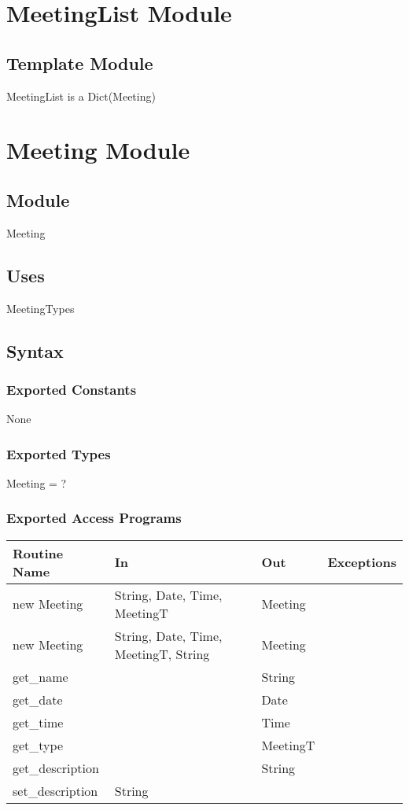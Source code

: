 \documentclass[12pt, titlepage]{article}
\begin{document}
\newpage
\section* {MeetingList Module}

\subsection*{Template Module}
MeetingList is a Dict(Meeting)

\newpage

\section* {Meeting Module}

\subsection*{Module}
Meeting

\subsection* {Uses}
MeetingTypes

\subsection* {Syntax}
\subsubsection* {Exported Constants}
None

\subsubsection* {Exported Types}
Meeting = ?

\subsubsection* {Exported Access Programs}
\begin{tabular}{|l|l|l|l|}
    \hline
    \textbf{Routine Name} & \textbf{In} & \textbf{Out} & \textbf{Exceptions} \\
    \hline
    new Meeting & String, Date, Time, MeetingT & Meeting & \\
    \hline
    new Meeting & String, Date, Time, MeetingT, String & Meeting & \\
    \hline
    get\_name & & String &\\
    \hline
    get\_date & & Date &\\
    \hline
    get\_time & & Time &\\
    \hline
    get\_type & & MeetingT &\\
    \hline
    get\_description & & String &\\
    \hline
    set\_description & String & & \\
    \hline
\end{tabular}
\end{document}
